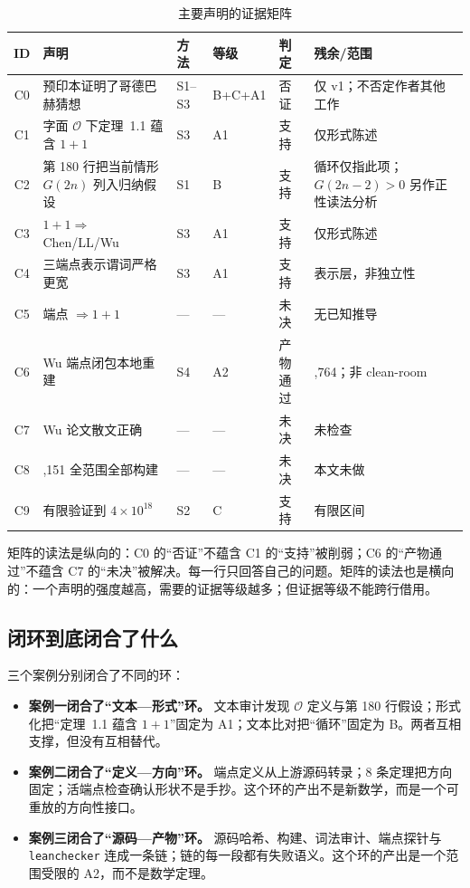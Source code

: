 \documentclass[11pt,a4paper]{ctexart}
\theoremstyle{plain}
\theoremstyle{definition}
\begin{document}
\begin{table}[htbp]
\centering
\footnotesize
\caption{主要声明的证据矩阵}
\label{tab:matrix}
\begin{tabularx}{\textwidth}{@{}c
>{\raggedright\arraybackslash}p{}
>{\raggedright\arraybackslash}p{}
>{\raggedright\arraybackslash}p{}
>{\raggedright\arraybackslash}p{}
>{\raggedright\arraybackslash}X@{}}
\toprule
ID & 声明 & 方法 & 等级 & 判定 & 残余/范围\\
\midrule
C0 & 预印本证明了哥德巴赫猜想 & S1--S3 & B+C+A1 & 否证 & 仅 v1；不否定作者其他工作\\
C1 & 字面 $\mathcal O$ 下定理~1.1 蕴含 $1+1$ & S3 & A1 & 支持 & 仅形式陈述\\
C2 & 第 180 行把当前情形 $G(2n)$ 列入归纳假设 & S1 & B & 支持 & 循环仅指此项；$G(2n-2)>0$ 另作正性读法分析\\
C3 & $1+1\Rightarrow$ Chen/LL/Wu & S3 & A1 & 支持 & 仅形式陈述\\
C4 & 三端点表示谓词严格更宽 & S3 & A1 & 支持 & 表示层，非独立性\\
C5 & 端点 $\Rightarrow1+1$ & — & — & 未决 & 无已知推导\\
C6 & Wu 端点闭包本地重建 & S4 & A2 & 产物通过 & 3,764；非 clean-room\\
C7 & Wu 论文散文正确 & — & — & 未决 & 未检查\\
C8 & 4,151 全范围全部构建 & — & — & 未决 & 本文未做\\
C9 & 有限验证到 $4\times10^{18}$ & S2 & C & 支持 & 有限区间\\
\bottomrule
\end{tabularx}
\end{table}

矩阵的读法是纵向的：C0 的“否证”不蕴含 C1 的“支持”被削弱；C6 的“产物通过”不蕴含 C7 的“未决”被解决。每一行只回答自己的问题。矩阵的读法也是横向的：一个声明的强度越高，需要的证据等级越多；但证据等级不能跨行借用。

\subsection{闭环到底闭合了什么}
\label{sec:what-closed}

三个案例分别闭合了不同的环：

\begin{itemize}
\item \textbf{案例一闭合了“文本—形式”环。} 文本审计发现 $\mathcal O$ 定义与第 180 行假设；形式化把“定理~1.1 蕴含 $1+1$”固定为 A1；文本比对把“循环”固定为 B。两者互相支撑，但没有互相替代。
\item \textbf{案例二闭合了“定义—方向”环。} 端点定义从上游源码转录；8 条定理把方向固定；活端点检查确认形状不是手抄。这个环的产出不是新数学，而是一个可重放的方向性接口。
\item \textbf{案例三闭合了“源码—产物”环。} 源码哈希、构建、词法审计、端点探针与 \texttt{leanchecker} 连成一条链；链的每一段都有失败语义。这个环的产出是一个范围受限的 A2，而不是数学定理。
\end{itemize}
\end{document}
